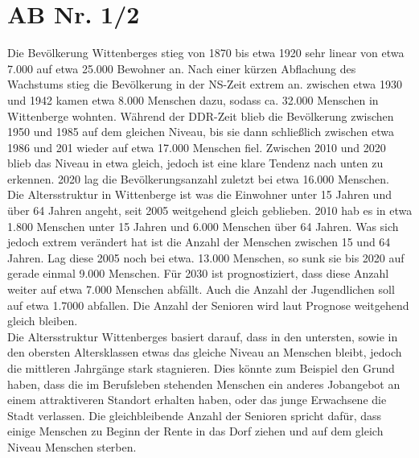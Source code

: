 \documentclass[12pt,a4paper]{report}
\begin{document}
	\section{AB Nr. 1/2}
	Die Bevölkerung Wittenberges stieg von 1870 bis etwa 1920 sehr linear von etwa 7.000 auf etwa 25.000 Bewohner an.
	Nach einer kürzen Abflachung des Wachstums stieg die Bevölkerung in der NS-Zeit extrem an.
	zwischen etwa 1930 und 1942 kamen etwa 8.000 Menschen dazu, sodass ca. 32.000 Menschen in Wittenberge wohnten.
	Während der DDR-Zeit blieb die Bevölkerung zwischen 1950 und 1985 auf dem gleichen Niveau, bis sie dann schließlich zwischen etwa 1986 und 201 wieder auf etwa 17.000 Menschen fiel.
	Zwischen 2010 und 2020 blieb das Niveau in etwa gleich, jedoch ist eine klare Tendenz nach unten zu erkennen.
	2020 lag die Bevölkerungsanzahl zuletzt bei etwa 16.000 Menschen.
	\\
	Die Altersstruktur in Wittenberge ist was die Einwohner unter 15 Jahren und über 64 Jahren angeht, seit 2005 weitgehend gleich geblieben.
	2010 hab es in etwa 1.800 Menschen unter 15 Jahren und 6.000 Menschen über 64 Jahren.
	Was sich jedoch extrem verändert hat ist die Anzahl der Menschen zwischen 15 und 64 Jahren.
	Lag diese 2005 noch bei etwa. 13.000 Menschen, so sunk sie bis 2020 auf gerade einmal 9.000 Menschen.
	Für 2030 ist prognostiziert, dass diese Anzahl weiter auf etwa 7.000 Menschen abfällt.
	Auch die Anzahl der Jugendlichen soll auf etwa 1.7000 abfallen.
	Die Anzahl der Senioren wird laut Prognose weitgehend gleich bleiben.
	\\
	Die Altersstruktur Wittenberges basiert darauf, dass in den untersten, sowie in den obersten Altersklassen etwas das gleiche Niveau an Menschen bleibt, jedoch die mittleren Jahrgänge stark stagnieren.
	Dies könnte zum Beispiel den Grund haben, dass die im Berufsleben stehenden Menschen ein anderes Jobangebot an einem attraktiveren Standort erhalten haben, oder das junge Erwachsene die Stadt verlassen.
	Die gleichbleibende Anzahl der Senioren spricht dafür, dass einige Menschen zu Beginn der Rente in das Dorf ziehen und auf dem gleich Niveau Menschen sterben.
\end{document}
